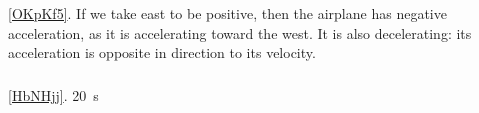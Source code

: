 \documentclass[main-ap-physics.tex]{subfiles}
\begin{document}
\subsubsection*{} %

\ref{OKpKf5}. If we take east to be positive, then the airplane has negative acceleration, as it is accelerating toward the west. It is also decelerating: its acceleration is opposite in direction to its velocity.\\

\subsubsection*{} %
\ref{HbNHjj}. \SI{20}{s}\\
\end{document}
